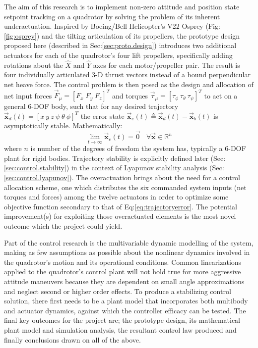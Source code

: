 The aim of this research is to implement non-zero attitude and position state setpoint tracking on a quadrotor by solving the problem of its inherent underactuation. Inspired by Boeing/Bell Helicopter's V22 Osprey (Fig:\ref{fig:osprey}) and the tilting articulation of its propellers, the prototype design proposed here (described in Sec:\ref{sec:proto.design}) introduces two additional actuators for each of the quadrotor's four lift propellers, specifically adding rotations about the $\hat{X}$ and $\hat{Y}$ axes for each motor/propeller pair. The result is four individually articulated 3-D thrust vectors instead of a bound perpendicular net heave force. The control problem is then posed as the design and allocation of net input forces $\vec{F}_{\mu} = [F_x\;F_y\;F_z]^T$ and torques $\vec{\tau}_{\mu} = [\tau_{\phi}~\tau_{\theta}~\tau_{\psi}]^T$ to act on a general 6-DOF body, such that for any desired trajectory $\vec{\mathbf{x}}_d(t)=[x~y~z~\psi~\theta~\phi]^T$ the error state $\vec{\mathbf{x}}_e(t) \triangleq \vec{\mathbf{x}}_d(t) - \vec{\mathbf{x}}_b(t)$ is asymptotically stable. Mathematically:
\begin{equation} \label{eq:trajectoryerror}
\lim_{t \rightarrow \infty} \vec{\mathbf{x}}_e(t) = \vec{0}~~~~\forall \vec{\mathbf{x}} \in \mathbb{R}^n
\end{equation}
where $n$ is number of the degrees of freedom the system has, typically a 6-DOF plant for rigid bodies. Trajectory stability is explicitly defined later (Sec:\ref{sec:control.stability}) in the context of Lyapunov stability analysis (Sec:\ref{sec:control.lyapunov}). The overactuation brings about the need for a control allocation scheme, one which distributes the six commanded system inputs (net torques and forces) among the twelve actuators in order to optimize some objective function secondary to that of Eq:\ref{eq:trajectoryerror}. The potential improvement(s) for exploiting those overactuated elements is the most novel outcome which the project could yield.
\par
Part of the control research is the multivariable dynamic modelling of the system, making as few assumptions as possible about the nonlinear dynamics involved in the quadrotor's motion and its operational conditions. Common linearizations applied to the quadrotor's control plant will not hold true for more aggressive attitude maneuvers because they are dependent on small angle approximations and neglect second or higher order effects. To produce a stabilizing control solution, there first needs to be a plant model that incorporates both multibody and actuator dynamics, against which the controller efficacy can be tested. The final key outcomes for the project are; the prototype design, its mathematical plant model and simulation analysis, the resultant control law produced and finally conclusions drawn on all of the above.
